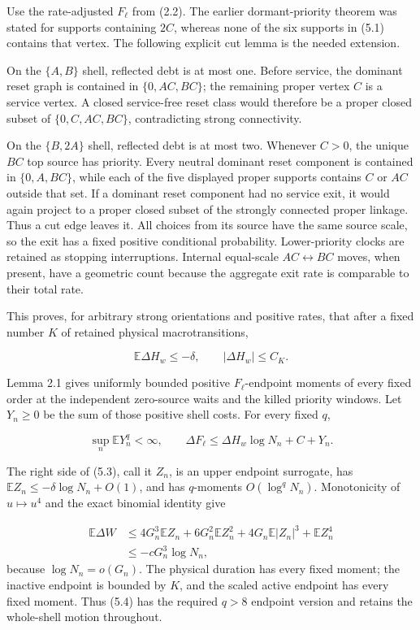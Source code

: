 Use the rate-adjusted \(F_\ell\) from (2.2). The earlier
dormant-priority theorem was stated for supports containing \(2C\),
whereas none of the six supports in (5.1) contains that vertex. The
following explicit cut lemma is the needed extension.

On the \(\{A,B\}\) shell, reflected debt is at most one. Before service,
the dominant reset graph is contained in \(\{0,AC,BC\}\); the remaining
proper vertex \(C\) is a service vertex. A closed service-free reset
class would therefore be a proper closed subset of \(\{0,C,AC,BC\}\),
contradicting strong connectivity.

On the \(\{B,2A\}\) shell, reflected debt is at most two. Whenever
\(C>0\), the unique \(BC\) top source has priority. Every neutral
dominant reset component is contained in \(\{0,A,BC\}\), while each of
the five displayed proper supports contains \(C\) or \(AC\) outside that
set. If a dominant reset component had no service exit, it would again
project to a proper closed subset of the strongly connected proper
linkage. Thus a cut edge leaves it. All choices from its source have the
same source scale, so the exit has a fixed positive conditional
probability. Lower-priority clocks are retained as stopping
interruptions. Internal equal-scale \(AC\leftrightarrow BC\) moves, when
present, have a geometric count because the aggregate exit rate is
comparable to their total rate.

This proves, for arbitrary strong orientations and positive rates, that
after a fixed number \(K\) of retained physical macrotransitions,

\[
 \mathbb E\Delta H_w\le-\delta,
 \qquad |\Delta H_w|\le C_K.                          \tag{5.2}
\]

Lemma 2.1 gives uniformly bounded positive \(F_\ell\)-endpoint moments
of every fixed order at the independent zero-source waits and the killed
priority windows. Let \(Y_n\ge0\) be the sum of those positive shell
costs. For every fixed \(q\),

\[
 \sup_n\mathbb E Y_n^q<\infty,
 \qquad
 \Delta F_\ell\le \Delta H_w\log N_n+C+Y_n.           \tag{5.3}
\]

The right side of (5.3), call it \(Z_n\), is an upper endpoint
surrogate, has \(\mathbb EZ_n\le-\delta\log N_n+O(1)\), and has
\(q\)-moments \(O(\log^qN_n)\). Monotonicity of \(u\mapsto u^4\) and the
exact binomial identity give

\[
\begin{split}
 \mathbb E\Delta W
 &\le4G_n^3\mathbb EZ_n
   +6G_n^2\mathbb EZ_n^2
   +4G_n\mathbb E|Z_n|^3+\mathbb EZ_n^4\\
 &\le-cG_n^3\log N_n,
\end{split}\tag{5.4}
\]
because \(\log N_n=o(G_n)\). The physical duration has every fixed
moment; the inactive endpoint is bounded by \(K\), and the scaled active
endpoint has every fixed moment. Thus (5.4) has the required \(q>8\)
endpoint version and retains the whole-shell motion throughout.

